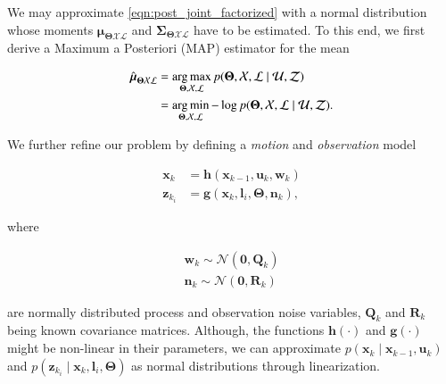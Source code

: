 We may approximate \eqref{eqn:post_joint_factorized} with a normal distribution
whose moments $\boldsymbol{\mu}_{\boldsymbol{\Theta}\mathcal{X}\mathcal{L}}$ and
$\boldsymbol{\Sigma}_{\boldsymbol{\Theta}\mathcal{X}\mathcal{L}}$ have to be
estimated. To this end, we first derive a Maximum a Posteriori (MAP) estimator
for the mean

\begin{equation}\label{eqn:map_estimator}
  \begin{aligned}
  \hat{\boldsymbol{\mu}}_{\boldsymbol{\Theta}\mathcal{X}\mathcal{L}} &=
    \operatorname*{arg\,max}_{\boldsymbol{\Theta},\mathcal{X},\mathcal{L}}
    p(\boldsymbol{\Theta}, \mathcal{X},\mathcal{L} \mid\mathcal{U},\mathcal{Z})
    \\
    &= \operatorname*{arg\,min}_{\boldsymbol{\Theta},\mathcal{X},\mathcal{L}}-\log
    p(\boldsymbol{\Theta}, \mathcal{X},\mathcal{L} \mid\mathcal{U},\mathcal{Z}).
  \end{aligned}
\end{equation}

We further refine our problem by defining a \emph{motion} and \emph{observation}
model

\begin{equation}\label{eqn:process_model}
  \begin{aligned}
  \mathbf{x}_k &= \mathbf{h}(\mathbf{x}_{k-1}, \mathbf{u}_k, \mathbf{w}_k)\\
  \mathbf{z}_{k_i} &= \mathbf{g}(\mathbf{x}_{k}, \mathbf{l}_i,
    \boldsymbol{\Theta}, \mathbf{n}_k),
  \end{aligned}
\end{equation}

where

\begin{equation}\label{eqn:noise_model}
  \begin{aligned}
  \mathbf{w}_k \sim \mathcal{N}(\mathbf{0},\mathbf{Q}_k)\\
  \mathbf{n}_k \sim \mathcal{N}(\mathbf{0},\mathbf{R}_k)
  \end{aligned}
\end{equation}

are normally distributed process and observation noise variables,
$\mathbf{Q}_k$ and $\mathbf{R}_k$ being known covariance matrices. Although, the
functions $\mathbf{h}(\cdot)$ and $\mathbf{g}(\cdot)$ might be non-linear in
their parameters, we can approximate
$p(\mathbf{x}_k\mid\mathbf{x}_{k - 1},\mathbf{u}_k)$ and
$p(\mathbf{z}_{k_i}\mid\mathbf{x}_k, \mathbf{l}_i,\boldsymbol{\Theta})$ as
normal distributions through linearization.

